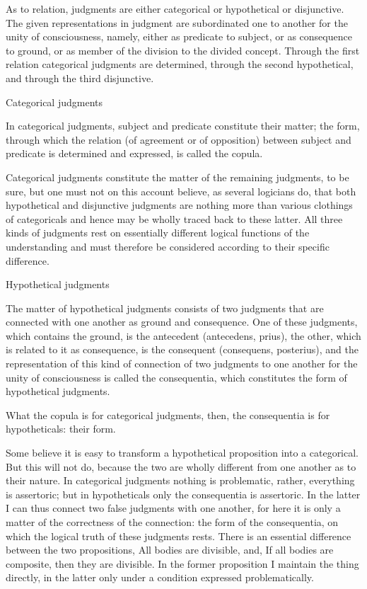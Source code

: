 As to relation, judgments are either categorical or hypothetical or disjunctive.
The given representations in judgment are subordinated one to another
for the unity of consciousness, namely, either
as predicate to subject, or
as consequence to ground, or
as member of the division to the divided concept.
Through the first relation categorical judgments are determined,
through the second hypothetical,
and through the third disjunctive.

Categorical judgments

In categorical judgments, subject and predicate constitute their matter;
the form, through which the relation (of agreement or of opposition)
between subject and predicate is determined and expressed,
is called the copula.

    Categorical judgments constitute the matter of the remaining judgments,
    to be sure, but one must not on this account believe,
    as several logicians do, that both hypothetical and disjunctive judgments are
    nothing more than various clothings of categoricals and
    hence may be wholly traced back to these latter.
    All three kinds of judgments rest on essentially
    different logical functions of the understanding and
    must therefore be considered according to their specific difference.

Hypothetical judgments

The matter of hypothetical judgments consists of
two judgments that are connected with one another
as ground and consequence.
One of these judgments, which contains the ground, is
the antecedent (antecedens, prius),
the other, which is related to it as consequence, is
the consequent (consequens, posterius),
and the representation of this kind of connection of
two judgments to one another for the unity of consciousness is called the consequentia,
which constitutes the form of hypothetical judgments.

    What the copula is for categorical judgments, then,
    the consequentia is for hypotheticals: their form.

    Some believe it is easy to transform a
    hypothetical proposition into a categorical.
    But this will not do, because the two are wholly different from
    one another as to their nature.
    In categorical judgments nothing is problematic,
    rather, everything is assertoric;
    but in hypotheticals only the consequentia is assertoric.
    In the latter I can thus connect two false judgments with one another,
    for here it is only a matter of the correctness of the connection:
    the form of the consequentia, on which the logical truth of these judgments rests.
    There is an essential difference between the two propositions,
    All bodies are divisible, and,
    If all bodies are composite, then they are divisible.
    In the former proposition I maintain the thing directly,
    in the latter only under a condition expressed problematically.

